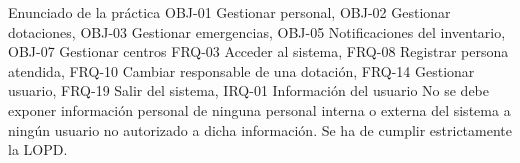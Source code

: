 {\reportauthors}
{Enunciado de la práctica}
{OBJ-01 Gestionar personal, OBJ-02 Gestionar dotaciones, OBJ-03 Gestionar emergencias, OBJ-05 Notificaciones del inventario, OBJ-07 Gestionar centros}
{FRQ-03 Acceder al sistema, FRQ-08 Registrar persona atendida, FRQ-10 Cambiar responsable de una dotación, FRQ-14 Gestionar usuario, FRQ-19 Salir del sistema, IRQ-01 Información del usuario}
{No se debe exponer información personal de ninguna personal interna o externa del sistema a ningún usuario no autorizado a dicha información. Se ha de cumplir estrictamente la LOPD.}

